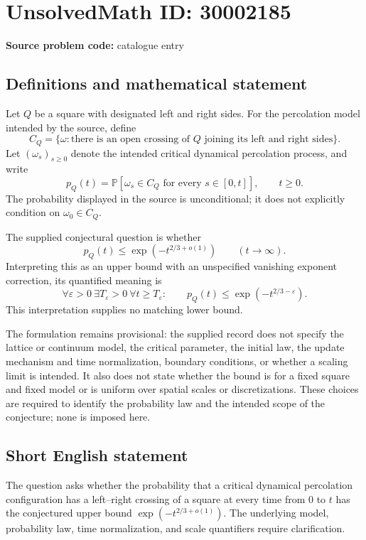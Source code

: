 \documentclass[11pt]{article}
\begin{document}
\section*{UnsolvedMath ID: 30002185}
\textbf{Source problem code:} catalogue entry
\subsection{Definitions and mathematical statement}
Let \(Q\) be a square with designated left and right sides. For the percolation model intended by the source, define
\[
C_Q=\{\omega:\text{there is an open crossing of }Q\text{ joining its left and right sides}\}.
\]
Let \((\omega_s)_{s\geq0}\) denote the intended critical dynamical percolation process, and write
\[
p_Q(t)=\mathbb P\!\left[\omega_s\in C_Q\text{ for every }s\in[0,t]\right],\qquad t\geq0.
\]
The probability displayed in the source is unconditional; it does not explicitly condition on \(\omega_0\in C_Q\).

The supplied conjectural question is whether
\[
p_Q(t)\leq\exp\!\left(-t^{2/3+o(1)}\right)\qquad(t\to\infty).
\]
Interpreting this as an upper bound with an unspecified vanishing exponent correction, its quantified meaning is
\[
\forall\varepsilon>0\ \exists T_\varepsilon>0\ \forall t\geq T_\varepsilon:
\qquad p_Q(t)\leq\exp\!\left(-t^{2/3-\varepsilon}\right).
\]
This interpretation supplies no matching lower bound.

The formulation remains provisional: the supplied record does not specify the lattice or continuum model, the critical parameter, the initial law, the update mechanism and time normalization, boundary conditions, or whether a scaling limit is intended. It also does not state whether the bound is for a fixed square and fixed model or is uniform over spatial scales or discretizations. These choices are required to identify the probability law and the intended scope of the conjecture; none is imposed here.
\subsection{Short English statement}
The question asks whether the probability that a critical dynamical percolation configuration has a left--right crossing of a square at every time from \(0\) to \(t\) has the conjectured upper bound \(\exp(-t^{2/3+o(1)})\). The underlying model, probability law, time normalization, and scale quantifiers require clarification.
\end{document}
